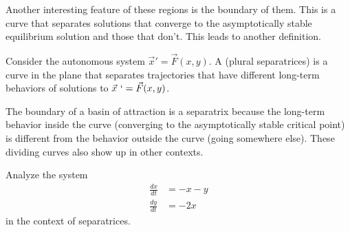 Another interesting feature of these regions is the boundary of them. This is a curve that separates solutions that converge to the asymptotically stable equilibrium solution and those that don't. This leads to another definition.

\begin{definition}[Separatrix]
Consider the autonomous system $\vec{x}' = \vec{F}(x,y)$. A \emph{} (plural separatrices) is a curve in the plane that separates trajectories that have different long-term behaviors of solutions to $\vec{x}\ ` = \vec{F}(x,y)$.
\end{definition}

The boundary of a basin of attraction is a separatrix because the long-term behavior inside the curve (converging to the asymptotically stable critical point) is different from the behavior outside the curve (going somewhere else). These dividing curves also show up in other contexts.

\begin{example} \label{ex:Separatrix}
Analyze the system
\begin{equation*}
\begin{split}
\frac{dx}{dt} &= -x -y\\
\frac{dy}{dt} &= -2x
\end{split}
\end{equation*}
in the context of separatrices.
\end{example}


